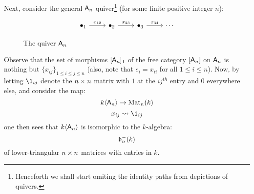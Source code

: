 \begin{example}
                Next, consider the general $\mathsf{A}_n$ quiver\footnote{Henceforth we shall start omiting the identity paths from depictions of quivers.} (for some finite positive integer $n$):
                    \begin{figure}[H]
                        \centering
                            $$
                                \begin{tikzcd}
                                	{\bullet_1} & {\bullet_2} & {\bullet_3} & \cdots
                                	\arrow["{x_{12}}", from=1-1, to=1-2]
                                	\arrow["{x_{23}}", from=1-2, to=1-3]
                                	\arrow["{x_{34}}", from=1-3, to=1-4]
                                \end{tikzcd}
                            $$
                        \caption{The quiver $\mathsf{A}_n$}
                        \label{fig: A_n_quiver}
                    \end{figure}
                Observe that the set of morphisms $[\mathsf{A}_n]_1$ of the free category $[\mathsf{A}_n]$ on $\mathsf{A}_n$ is nothing but $\{x_{ij}\}_{1 \leq i \leq j \leq n}$ (also, note that $e_i = x_{ii}$ for all $1 \leq i \leq n$). Now, by letting $\1_{ij}$ denote the $n \x n$ matrix with $1$ at the $ij^{th}$ entry and $0$ everywhere else, and consider the map:
                    $$k\langle\mathsf{A}_n\rangle \to \mathrm{Mat}_n(k)$$
                    $$x_{ij} \mapsto \1_{ij}$$
                one then sees that $k\langle\mathsf{A}_n\rangle$ is isomorphic to the $k$-algebra:
                    $$\mathfrak{b}_n^-(k)$$
                of lower-triangular $n \x n$ matrices with entries in $k$.
            \end{example}
